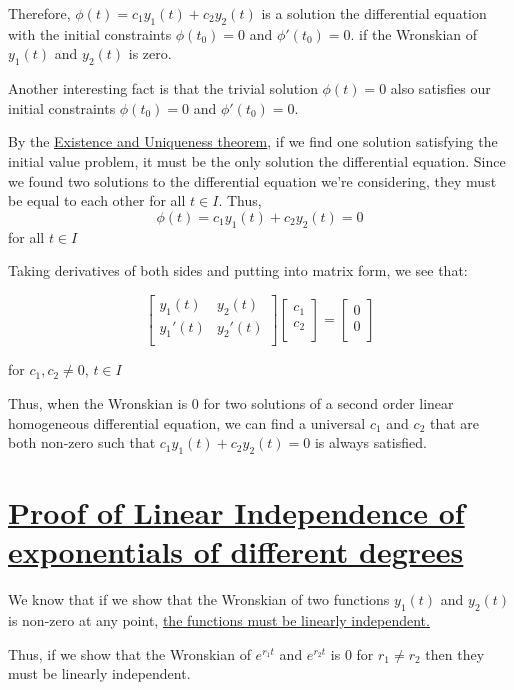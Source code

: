 \documentclass{report}
\begin{document}
Therefore, $\phi(t) = c_1y_1(t) + c_2y_2(t)$ is a solution the differential equation with the initial constraints $\phi(t_0) = 0$ and $\phi'(t_0) = 0$. if the Wronskian of $y_1(t)$ and $y_2(t)$ is zero. 

Another interesting fact is that the trivial solution $\phi(t) = 0$ also satisfies our initial constraints $\phi(t_0) = 0$ and $\phi'(t_0) = 0$.

By the  \hyperref[th:Ex&Un]{Existence and Uniqueness theorem}, if we find one solution satisfying the initial value problem, it must be the only solution the differential equation. Since we found two solutions to the differential equation we're considering, they must be equal to each other for all $t \in I$.
Thus,
$$\phi(t) = c_1y_1(t) +c_2y_2(t) = 0$$
for all $t \in I$

Taking derivatives of both sides and putting into matrix form, we see that:

$$
\begin{bmatrix}
    y_1(t) & y_2(t) \\
    y_1'(t) & y_2'(t) \\
\end{bmatrix}
\begin{bmatrix}
    c_1 \\
    c_2 \\
\end{bmatrix}
=
\begin{bmatrix}
    0 \\
    0 \\
\end{bmatrix}
$$

for $c_1, c_2 \neq 0$, $t \in I$

Thus, when the Wronskian is 0 for two solutions of a second order linear homogeneous differential equation, we can find a universal $c_1$ and $c_2$ that are both non-zero such that $c_1y_1(t) +c_2y_2(t) = 0$ is always satisfied. 


\section{\hyperref[th:expLinInd]{Proof of Linear Independence of exponentials of different degrees}}
\label{sec:prExpLinInd}
We know that  if we show that the Wronskian of two functions $y_1(t)$ and $y_2(t)$ is non-zero at any point, \hyperref[th:wronLinInd]{the functions must be linearly independent.}

Thus, if we show that the Wronskian of $e^{r_1t}$ and $e^{r_2t}$ is 0 for $r_1 \neq r_2$ then they must be linearly independent.
\end{document}
